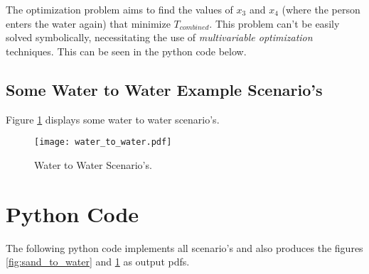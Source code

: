 \documentclass[11pt, a4paper]{article}
\begin{document}
The optimization problem aims to find the values of \( x_3 \) and \( x_4 \) (where the person enters the water again)
that minimize \( T_{combined} \). This problem can't be easily solved symbolically, necessitating the use of
\emph{multivariable optimization} techniques. This can be seen in the python code below.

\subsection{Some Water to Water Example Scenario's}

Figure \ref{fig:water_to_water} displays some water to water scenario's.

\begin{figure}[htbp] %
    \centering %
    \texttt{[image: water\_to\_water.pdf]} %
    \caption{Water to Water Scenario's.} %
    \label{fig:water_to_water} %
\end{figure}


\section{Python Code}

The following python code implements all scenario's and also produces the figures
\ref{fig:sand_to_water} and \ref{fig:water_to_water} as output pdfs.



\printindex
\end{document}

